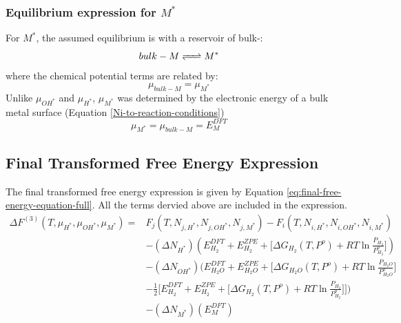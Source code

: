 \documentclass[12pt]{article}
\begin{document}
\subsubsection{Equilibrium expression for $M^{*}$}
For $M^{*}$, the assumed equilibrium is with a reservoir of bulk-:
\begin{equation}
    bulk-M \ce{<=>} M^{*}
\end{equation}
where the chemical potential terms are related by: 
\begin{equation}
    \mu_{bulk-M} = \mu_{M^{*}}
\end{equation}
Unlike $\mu_{OH^{*}}$ and $\mu_{H^{*}}$, $\mu_{M^{*}}$ was determined by the  electronic energy of a bulk metal surface (Equation \ref{Ni-to-reaction-conditions})
\begin{equation}
    \mu_{M^{*}} = \mu_{bulk-M} = E_{M}^{DFT}
    \label{Ni-to-reaction-conditions}
\end{equation}

\subsection{Final Transformed Free Energy Expression}
The final transformed free energy expression is given by Equation \ref{eq:final-free-energy-equation-full}. All the terms dervied above are included in the expression. 
\begin{equation}
    \begin{split}
        \Delta F^{(3)}(T,\mu_{H^{*}},\mu_{OH^{*}},\mu_{M^{*}})  = 
        & F_{j}(T,N_{j,H^{*}},N_{j,OH^{*}},N_{j,M^{*}}) - 
          F_{i}(T,N_{i,H^{*}},N_{i,OH^{*}},N_{i,M^{*}}) \\
        & - (\Delta N_{H^{*}}) (E_{H_{2}}^{DFT} + E_{H_{2}}^{ZPE} + \Big[ \Delta G_{H_{2}}(T,P^{o})  + RT \ln{ \frac{P_{H_2}}{P_{H_2}^{o}}} \Big])  \\
        & - (\Delta N_{OH^{*}}) \Big( E_{H_{2}O}^{DFT} + E_{H_{2}O}^{ZPE} + \Big[ \Delta G_{H_{2}O}(T,P^{o})  + RT \ln{ \frac{P_{H_{2}O}}{P_{H_{2}O}^{o}}} \Big] \\ 
        & - \frac{1}{2} \Big[ E_{H_{2}}^{DFT} + E_{H_{2}}^{ZPE} + \big[ \Delta G_{H_{2}}(T,P^{o})  + RT \ln{ \frac{P_{H_2}}{P_{H_2}^{o}}} \big] \Big] \Big) \\
        & - (\Delta N_{M^{*}}) (E_{M}^{DFT}) \\ 
    \end{split}
    \label{eq:final-free-energy-equation-full}
\end{equation}
\end{document}
